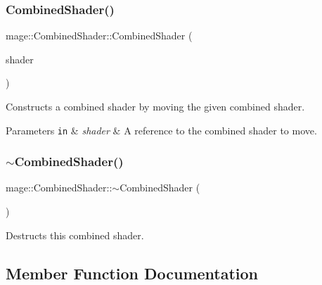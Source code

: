 \subsubsection{\texorpdfstring{Combined\+Shader()}{CombinedShader()}\hspace{0.1cm}{\footnotesize\ttfamily [3/3]}}
{\footnotesize\ttfamily mage\+::\+Combined\+Shader\+::\+Combined\+Shader (\begin{DoxyParamCaption}\item[{\hyperlink{structmage_1_1_combined_shader}{Combined\+Shader} \&\&}]{shader }\end{DoxyParamCaption})\hspace{0.3cm}{\ttfamily [default]}}

Constructs a combined shader by moving the given combined shader.


\begin{DoxyParams}[1]{Parameters}
\mbox{\tt in}  & {\em shader} & A reference to the combined shader to move. \\
\hline
\end{DoxyParams}
\hypertarget{structmage_1_1_combined_shader_a6b1767d2525724f2f9120df87253973e}{}\label{structmage_1_1_combined_shader_a6b1767d2525724f2f9120df87253973e} 
\subsubsection{\texorpdfstring{$\sim$\+Combined\+Shader()}{~CombinedShader()}}
{\footnotesize\ttfamily mage\+::\+Combined\+Shader\+::$\sim$\+Combined\+Shader (\begin{DoxyParamCaption}{ }\end{DoxyParamCaption})\hspace{0.3cm}{\ttfamily [default]}}

Destructs this combined shader. 

\subsection{Member Function Documentation}
\hypertarget{structmage_1_1_combined_shader_a14859fb597c07309fd269b56af373c02}{}\label{structmage_1_1_combined_shader_a14859fb597c07309fd269b56af373c02} 
